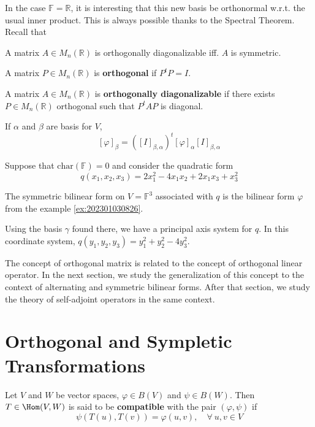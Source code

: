 In the case $\mathbb{F} = \mathbb{R}$, it is interesting that this new basis be orthonormal w.r.t. the usual inner product. This is always possible thanks to the Spectral Theorem. Recall that 

\begin{theorem}
A matrix $A \in M_n(\mathbb{R})$ is orthogonally diagonalizable iff. $A$ is symmetric. 
\end{theorem}

\begin{definition}
A matrix $P \in M_n(\mathbb{R})$ is \textbf{orthogonal} if $P^t P = I$. 

A matrix $A \in M_n(\mathbb{R})$ is \textbf{orthogonally diagonalizable} if there exists $P \in M_n(\mathbb{R})$ orthogonal such that $P^t A P$ is diagonal. 
\end{definition} 

\begin{theorem}
If $\alpha$ and $\beta$ are basis for $V$, 
\[
  [\varphi]_\beta = ([I]_{\beta, \alpha})^t [\varphi]_\alpha [I]_{\beta, \alpha}
\]
\end{theorem}

\begin{example}
  Suppose that $\text{char}(\mathbb{F}) = 0$ and consider the quadratic form 
  \[
    q(x_1, x_2, x_3) = 2x_1^2 - 4x_1 x_2 + 2x_1 x_3 + x_3^2
  \]

  The symmetric bilinear form on $V = \mathbb{F}^3$ associated with $q$ is the bilinear form $\varphi$ from the example \ref{ex:202301030826}.
  
  Using the basis $\gamma$ found there, we have a principal axis system for $q$. In this coordinate system, $q(y_1, y_2, y_3) = y_1^2 + y_2^2 - 4 y_3^2$.
\end{example}

The concept of orthogonal matrix is related to the concept of orthogonal linear operator. In the next section, we study the generalization of this concept to the context of alternating and symmetric bilinear forms. After that section, we study the theory of self-adjoint operators in the same context. 

\section{Orthogonal and Sympletic Transformations}

\begin{definition}[Compatibility]
  Let $V$ and $W$ be vector spaces, $\varphi \in B(V)$ and $\psi \in B(W)$. Then $T \in \Hom(V,W)$ is said to be \textbf{compatible} with the pair $(\varphi, \psi)$ if 
  \[
    \psi(T(u), T(v)) = \varphi(u, v), \quad \forall ~u,v \in V
  \]
\end{definition}

